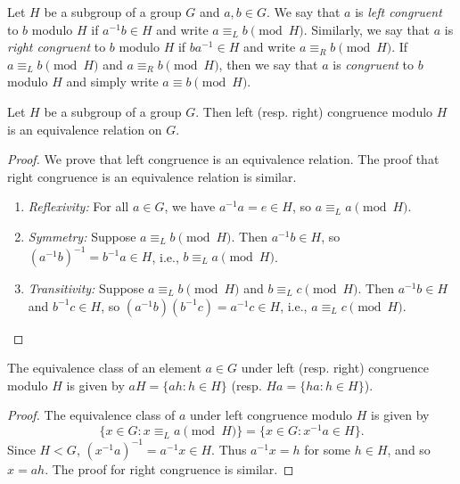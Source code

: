 \begin{definition}
    Let \(H\) be a subgroup of a group \(G\) and \(a, b \in G\). We say that
    \(a\) is \emph{left congruent} to \(b\) modulo \(H\) if \(a^{-1}b \in H\)
    and write \(a \equiv_L b \pmod{H}\). Similarly, we say that \(a\) is
    \emph{right congruent} to \(b\) modulo \(H\) if \(ba^{-1} \in H\) and write
    \(a \equiv_R b \pmod{H}\). If \(a \equiv_L b \pmod{H}\) and \(a \equiv_R b
    \pmod{H}\), then we say that \(a\) is \emph{congruent} to \(b\) modulo \(H\)
    and simply write \(a \equiv b \pmod{H}\).
\end{definition}

\begin{theorem}
    Let \(H\) be a subgroup of a group \(G\). Then left (resp. right) congruence
    modulo \(H\) is an equivalence relation on \(G\).
\end{theorem}

\begin{proof}
    We prove that left congruence is an equivalence relation. The proof that
    right congruence is an equivalence relation is similar.

    \begin{enumerate}
        \item \emph{Reflexivity:} For all \(a \in G\), we have \(a^{-1}a = e \in
        H\), so \(a \equiv_L a \pmod{H}\).
        \item \emph{Symmetry:} Suppose \(a \equiv_L b \pmod{H}\). Then \(a^{-1}b
        \in H\), so \((a^{-1}b)^{-1} = b^{-1}a \in H\), i.e., \(b \equiv_L a
        \pmod{H}\).
        \item \emph{Transitivity:} Suppose \(a \equiv_L b \pmod{H}\) and \(b
        \equiv_L c \pmod{H}\). Then \(a^{-1}b \in H\) and \(b^{-1}c \in H\), so
        \((a^{-1}b)(b^{-1}c) = a^{-1}c \in H\), i.e., \(a \equiv_L c \pmod{H}\).
    \end{enumerate}
\end{proof}

\begin{theorem}
    \label{thm:cosets-equiv-classes}
    The equivalence class of an element \(a \in G\) under left (resp. right)
    congruence modulo \(H\) is given by \(aH = \{ah : h \in H\}\) (resp. \(Ha =
    \{ha : h \in H\}\)).
\end{theorem}

\begin{proof}
    The equivalence class of \(a\) under left congruence modulo \(H\) is given
    by
    \[
        \{ x \in G : x \equiv_L a \pmod{H} \} = \{ x \in G : x^{-1}a \in H \}.
    \]
    Since \(H < G\), \((x^{-1}a)^{-1} = a^{-1}x \in H\). Thus \(a^{-1}x = h\)
    for some \(h \in H\), and so \(x = ah\). The proof for right congruence is
    similar.
\end{proof}

